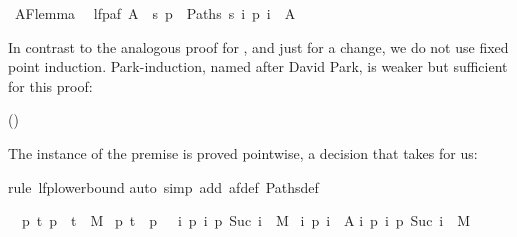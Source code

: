 \begin{isabellebody}
\begin{isamarkuptext}
\end{isamarkuptext}%
\isamarkuptrue%
\ AF{\isacharunderscore}lemma{}{\isacharcolon}\isanewline
\ \ {\isachardoublequote}lfp{\isacharparenleft}af\ A{\isacharparenright}\ {\isasymsubseteq}\ {\isacharbraceleft}s{\isachardot}\ {\isasymforall}p\ {\isasymin}\ Paths\ s{\isachardot}\ {\isasymexists}i{\isachardot}\ p\ i\ {\isasymin}\ A{\isacharbraceright}{\isachardoublequote}\isamarkupfalse%
%
\begin{isamarkuptxt}%
\noindent
In contrast to the analogous proof for , and just
for a change, we do not use fixed point induction.  Park-induction,
named after David Park, is weaker but sufficient for this proof:
\begin{center}
 \hfill ()
\end{center}
The instance of the premise  is proved pointwise,
a decision that  takes for us:%
\end{isamarkuptxt}%
\isamarkuptrue%
rule\ lfp{\isacharunderscore}lowerbound{\isacharparenright}\isanewline
\isamarkupfalse%
auto\ simp\ add{\isacharcolon}\ af{\isacharunderscore}def\ Paths{\isacharunderscore}def{\isacharparenright}\isamarkupfalse%
%
\begin{isamarkuptxt}%
\begin{isabelle}%
\ {}{\isachardot}\ {\isasymAnd}p{\isachardot}\ {\isasymlbrakk}{\isasymforall}t{\isachardot}\ {\isacharparenleft}p\ {}{\isacharcomma}\ t{\isacharparenright}\ {\isasymin}\ M\ {\isasymlongrightarrow}\isanewline
{}p{\isachardot}\ t\ {\isacharequal}\ p\ {}\ {\isasymand}\ {\isacharparenleft}{\isasymforall}i{\isachardot}\ {\isacharparenleft}p\ i{\isacharcomma}\ p\ {\isacharparenleft}Suc\ i{\isacharparenright}{\isacharparenright}\ {\isasymin}\ M{\isacharparenright}\ {\isasymlongrightarrow}\isanewline
{}i{\isachardot}\ p\ i\ {\isasymin}\ A{\isacharparenright}{\isacharparenright}{\isacharsemicolon}\isanewline
{}i{\isachardot}\ {\isacharparenleft}p\ i{\isacharcomma}\ p\ {\isacharparenleft}Suc\ i{\isacharparenright}{\isacharparenright}\ {\isasymin}\ M{\isasymrbrakk}\isanewline

\end{isabelle}
\end{isamarkuptxt}
\end{isabellebody}
